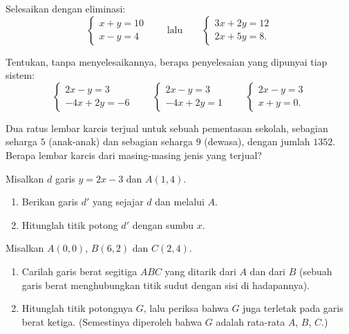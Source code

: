 \begin{exercise}[$\star$]\label{exo:g10:lines:6}
Selesaikan dengan eliminasi:
\[
\begin{cases}
x + y = 10 \\
x - y = 4
\end{cases}
\qquad\text{lalu}\qquad
\begin{cases}
3x + 2y = 12 \\
2x + 5y = 8 .
\end{cases}
\]
\end{exercise}

\begin{exercise}[$\star\star$]\label{exo:g10:lines:7}
Tentukan, tanpa menyelesaikannya, berapa penyelesaian yang dipunyai tiap sistem:
\[
\begin{cases}
2x - y = 3 \\
-4x + 2y = -6
\end{cases}
\qquad
\begin{cases}
2x - y = 3 \\
-4x + 2y = 1
\end{cases}
\qquad
\begin{cases}
2x - y = 3 \\
x + y = 0 .
\end{cases}
\]
\end{exercise}

\begin{exercise}[$\star\star$]\label{exo:g10:lines:8}
Dua ratus lembar karcis terjual untuk sebuah pementasan sekolah, sebagian
seharga $5$ (anak-anak) dan sebagian seharga $9$ (dewasa), dengan jumlah
$1352$. Berapa lembar karcis dari masing-masing jenis yang terjual?
\end{exercise}

\begin{exercise}[$\star\star$]\label{exo:g10:lines:9}
Misalkan $d$ garis $y = 2x - 3$ dan $A(1, 4)$.
\begin{enumerate}
  \item Berikan  garis $d'$ yang sejajar $d$ dan melalui
        $A$.
  \item Hitunglah titik potong $d'$ dengan sumbu $x$.
\end{enumerate}
\end{exercise}

\begin{exercise}[$\star\star\star$]\label{exo:g10:lines:10}
Misalkan $A(0, 0)$, $B(6, 2)$ dan $C(2, 4)$.
\begin{enumerate}
  \item Carilah  garis berat segitiga $ABC$ yang ditarik
        dari $A$ dan dari $B$ (sebuah garis berat menghubungkan titik sudut
        dengan  sisi di hadapannya).
  \item Hitunglah titik potongnya $G$, lalu periksa bahwa
        $G$ juga terletak pada garis berat ketiga. (Semestinya diperoleh bahwa
         $G$ adalah rata-rata  $A$, $B$, $C$.)
\end{enumerate}
\end{exercise}


